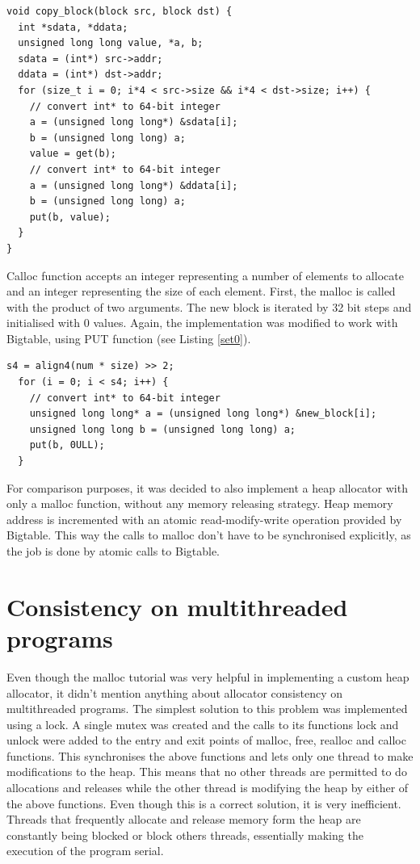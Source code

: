 \documentclass[bsc,frontabs,twoside,singlespacing,parskip,deptreport]{infthesis}     %
\begin{document}
\begin{lstlisting}[caption=copy\_block implementation, label=copyblock, style=block]
void copy_block(block src, block dst) {
  int *sdata, *ddata;
  unsigned long long value, *a, b;
  sdata = (int*) src->addr;
  ddata = (int*) dst->addr;
  for (size_t i = 0; i*4 < src->size && i*4 < dst->size; i++) {
    // convert int* to 64-bit integer
    a = (unsigned long long*) &sdata[i];
    b = (unsigned long long) a;  
    value = get(b);
    // convert int* to 64-bit integer
    a = (unsigned long long*) &ddata[i];
    b = (unsigned long long) a;
    put(b, value);
  }
}
\end{lstlisting}

Calloc function accepts an integer representing a number of elements to allocate and an integer representing the size of each element. First, the malloc is called with the product of two arguments. The new block is iterated by 32 bit steps and initialised with 0 values. Again, the implementation was modified to work with Bigtable, using PUT function (see Listing \ref{set0}).

\begin{lstlisting}[caption=new\_block initialisation with zeroes, label=set0, style=block]
  s4 = align4(num * size) >> 2;
  for (i = 0; i < s4; i++) {
    // convert int* to 64-bit integer
    unsigned long long* a = (unsigned long long*) &new_block[i];
    unsigned long long b = (unsigned long long) a;
    put(b, 0ULL);
  }
\end{lstlisting}

For comparison purposes, it was decided to also implement a heap allocator with only a malloc function, without any memory releasing strategy. Heap memory address is incremented with an atomic read-modify-write operation provided by Bigtable. This way the calls to malloc don't have to be synchronised explicitly, as the job is done by atomic calls to Bigtable. 

\section{Consistency on multithreaded programs}

Even though the malloc tutorial was very helpful in implementing a custom heap allocator, it didn't mention anything about allocator consistency on multithreaded programs. The simplest solution to this problem was implemented using a lock. A single mutex was created and the calls to its functions lock and unlock were added to the entry and exit points of malloc, free, realloc and calloc functions. This synchronises the above functions and lets only one thread to make modifications to the heap. This means that no other threads are permitted to do allocations and releases while the other thread is modifying the heap by either of the above functions. Even though this is a correct solution, it is very inefficient. Threads that frequently allocate and release memory form the heap are constantly being blocked or block others threads, essentially making the execution of the program serial.
\end{document}
